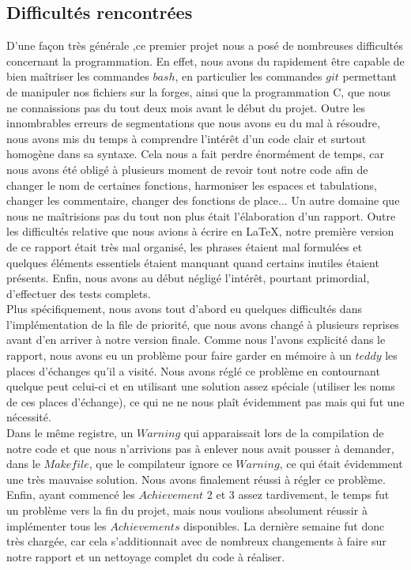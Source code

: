 \documentclass{article}
\begin{document}
\subsection{Difficultés rencontrées}
D'une façon très générale ,ce premier projet nous a posé de nombreuses difficultés concernant la programmation. En effet, nous avons du rapidement être capable de bien maîtriser les commandes $bash$, en particulier les commandes $git$ permettant de manipuler nos fichiers sur la forges, ainsi que la programmation C, que nous ne connaissions pas du tout deux mois avant le début du projet. Outre les innombrables erreurs de segmentations que nous avons eu du mal à résoudre, nous avons mis du temps à comprendre l'intérêt d'un code clair et surtout homogène dans sa syntaxe. Cela nous a fait perdre énormément de temps, car nous avons été obligé à plusieurs moment de revoir tout notre code afin de changer le nom de certaines fonctions, harmoniser  les espaces et tabulations, changer les commentaire, changer des fonctions de place... Un autre domaine que nous ne maîtrisions pas du tout non plus était l'élaboration d'un rapport. Outre les difficultés relative que nous avions à écrire en LaTeX, notre première version de ce rapport était très mal organisé, les phrases étaient mal formulées et quelques éléments essentiels étaient manquant quand certains inutiles étaient présents. Enfin, nous avons au début négligé l'intérêt, pourtant primordial, d'effectuer des tests complets.\\
Plus spécifiquement, nous avons tout d'abord eu quelques difficultés dans l'implémentation de la file de priorité, que nous avons changé à plusieurs reprises avant d'en arriver à notre version finale. Comme nous l'avons explicité dans le rapport, nous avons eu un problème pour faire garder en mémoire à un $teddy$ les places d'échanges qu'il a visité. Nous avons réglé ce problème en contournant quelque peut celui-ci et en utilisant une solution assez spéciale (utiliser les noms de ces places d'échange), ce qui ne ne nous plaît évidemment pas mais qui fut une nécessité.\\  
Dans le même registre, un $Warning$ qui apparaissait lors de la compilation de notre code et que nous n'arrivions pas à enlever nous avait pousser à demander, dans le $Makefile$, que le compilateur ignore ce $Warning$, ce qui était évidemment une très mauvaise solution. Nous avons finalement réussi à régler ce problème.   
Enfin, ayant commencé les $Achievement$ 2 et 3 assez tardivement, le temps fut un problème vers la fin du projet, mais nous voulions absolument réussir à implémenter tous les $Achievements$ disponibles. La dernière semaine fut donc très chargée, car cela s'additionnait avec de nombreux changements à faire sur notre rapport et un nettoyage complet du code à réaliser.  
\end{document}
